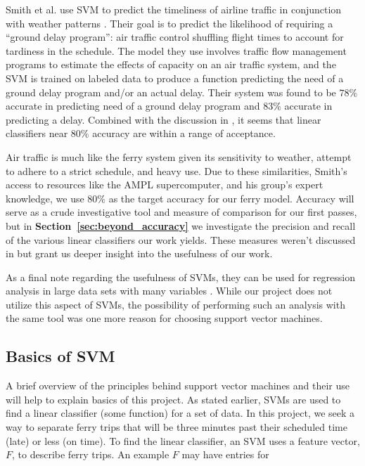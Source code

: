 \documentclass[11pt]{article} %
\begin{document}
Smith et al. use SVM to predict the timeliness of airline
traffic in conjunction with weather patterns \cite{smith2008decision}. Their goal is 
to predict the likelihood of requiring a ``ground delay program'': air traffic
control shuffling flight times
to account for tardiness in the schedule. The model they use involves traffic 
flow management programs to estimate the effects of capacity on an air traffic 
system, and the SVM is trained on labeled data to produce a function predicting 
the need of a ground delay program and/or an actual delay. Their system was
found to be $78\%$ accurate in predicting need of a ground delay program and $83\%$ 
accurate in predicting a delay. Combined with the discussion in 
\cite{byvatov2003comparison}, it seems that linear classifiers near $80\%$ 
accuracy are within a range of acceptance.

Air traffic is much like the ferry system given
its sensitivity to weather, attempt to adhere to a strict schedule, and heavy use.
Due to these similarities, Smith's access to resources like the AMPL supercomputer, 
and his group's expert knowledge, we use $80\%$ as the target accuracy for our
ferry model. Accuracy will serve as a crude investigative tool and measure of 
comparison for our first passes, but in \textbf{Section~\ref{sec:beyond_accuracy}}
we investigate the precision and recall of the various linear classifiers our
work yields. These measures weren't discussed in \cite{smith2008decision} but
grant us deeper insight into the usefulness of our work. 

As a final note regarding the usefulness of SVMs, they can be used for regression 
analysis in large
data sets with many variables \cite{chang2011libsvm}. While our project does not
utilize this aspect of SVMs, the possibility of performing such an analysis with the
same tool was one more reason for choosing support vector machines.


\subsection{Basics of SVM}
\label{sec:basics_svm}
A brief overview of the principles behind support vector machines and their use
will help to explain basics of this project. As stated earlier,
SVMs are used to find a linear classifier (some function) for a set of data.  In
this project, we seek a way to separate ferry trips that will be three minutes
past their scheduled time (late) or less (on time). To find the linear classifier,
an SVM uses a feature vector, $F$, to describe ferry trips.  An example $F$ may have
entries for
\end{document}
